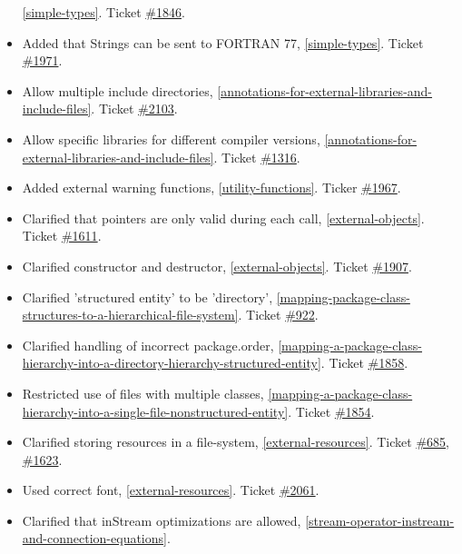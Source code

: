 \begin{itemize}
  \ref{simple-types}. Ticket
  \href{https://trac.modelica.org/Modelica/ticket/1846}{\#1846}.
\item
  Added that Strings can be sent to FORTRAN 77, \ref{simple-types}. Ticket
  \href{https://trac.modelica.org/Modelica/ticket/1971}{\#1971}.
\item
  Allow multiple include directories, \ref{annotations-for-external-libraries-and-include-files}. Ticket
  \href{https://trac.modelica.org/Modelica/ticket/2103}{\#2103}.
\item
  Allow specific libraries for different compiler versions, 
  \ref{annotations-for-external-libraries-and-include-files}. Ticket
  \href{https://trac.modelica.org/Modelica/ticket/1316}{\#1316}.
\item
  Added external warning functions, \ref{utility-functions}. Ticker
  \href{https://trac.modelica.org/Modelica/ticket/1967}{\#1967}.
\item
  Clarified that pointers are only valid during each call, \ref{external-objects}. Ticket
  \href{https://trac.modelica.org/Modelica/ticket/1611}{\#1611}.
\item
  Clarified constructor and destructor, \ref{external-objects}. Ticket
  \href{https://trac.modelica.org/Modelica/ticket/1907}{\#1907}.
\item
  Clarified 'structured entity' to be 'directory', \ref{mapping-package-class-structures-to-a-hierarchical-file-system}.
  Ticket \href{https://trac.modelica.org/Modelica/ticket/922}{\#922}.
\item
  Clarified handling of incorrect package.order, \ref{mapping-a-package-class-hierarchy-into-a-directory-hierarchy-structured-entity}.
  Ticket \href{https://trac.modelica.org/Modelica/ticket/1858}{\#1858}.
\item
  Restricted use of files with multiple classes, \ref{mapping-a-package-class-hierarchy-into-a-single-file-nonstructured-entity}.
  Ticket \href{https://trac.modelica.org/Modelica/ticket/1854}{\#1854}.
\item
  Clarified storing resources in a file-system, \ref{external-resources}. Ticket
  \href{https://trac.modelica.org/Modelica/ticket/685}{\#685},
  \href{https://trac.modelica.org/Modelica/ticket/1623}{\#1623}.
\item
  Used correct font, \ref{external-resources}. Ticket
  \href{https://trac.modelica.org/Modelica/ticket/2061}{\#2061}.
\item
  Clarified that inStream optimizations are allowed, \ref{stream-operator-instream-and-connection-equations}.

\end{itemize}
